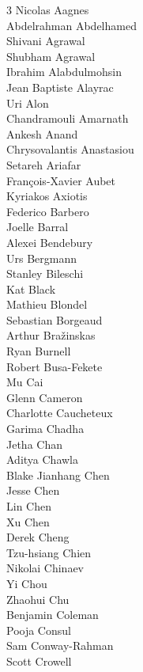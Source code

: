 \begin{multicols}{3}
\noindent
Nicolas Aagnes \\ 
Abdelrahman Abdelhamed \\ 
Shivani Agrawal \\ 
Shubham Agrawal \\ 
Ibrahim Alabdulmohsin \\ 
Jean Baptiste Alayrac \\ 
Uri Alon \\ 
Chandramouli Amarnath \\ 
Ankesh Anand \\ 
Chrysovalantis Anastasiou \\ 
Setareh Ariafar \\ 
François-Xavier Aubet \\ 
Kyriakos Axiotis \\ 
Federico Barbero \\ 
Joelle Barral \\ 
Alexei Bendebury \\ 
Urs Bergmann \\ 
Stanley Bileschi \\ 
Kat Black \\ 
Mathieu Blondel \\ 
Sebastian Borgeaud \\ 
Arthur Bražinskas \\ 
Ryan Burnell \\ 
Robert Busa-Fekete \\ 
Mu Cai \\ 
Glenn Cameron \\ 
Charlotte Caucheteux \\ 
Garima Chadha \\ 
Jetha Chan \\ 
Aditya Chawla \\ 
Blake Jianhang Chen \\ 
Jesse Chen \\ 
Lin Chen \\ 
Xu Chen \\ 
Derek Cheng \\ 
Tzu-hsiang Chien \\ 
Nikolai Chinaev \\ 
Yi Chou \\ 
Zhaohui Chu \\ 
Benjamin Coleman \\ 
Pooja Consul \\ 
Sam Conway-Rahman \\ 
Scott Crowell \\ 

\end{multicols}

